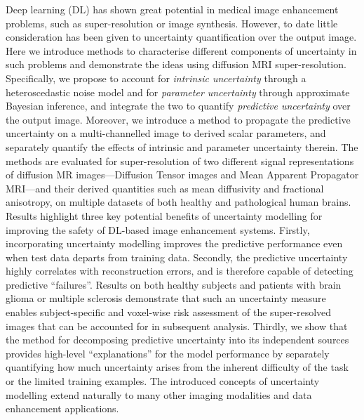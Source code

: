 	Deep learning (DL) has shown great potential in medical image enhancement problems, such as super-resolution or image synthesis. However, to date little consideration has been given to uncertainty quantification over the output image. Here we introduce methods to characterise different components of uncertainty in such problems and demonstrate the ideas using diffusion MRI super-resolution.  Specifically, we propose to account for \textit{intrinsic uncertainty} through a heteroscedastic noise model and for \textit{parameter uncertainty} through approximate Bayesian inference, and integrate the two to quantify \textit{predictive uncertainty} over the output image. Moreover, we introduce a method to propagate the predictive uncertainty on a multi-channelled image to derived scalar parameters, and separately quantify the effects of intrinsic and parameter uncertainty therein. The methods are evaluated for super-resolution of two different signal representations of diffusion MR images---Diffusion Tensor images and Mean Apparent Propagator MRI---and their derived quantities such as mean diffusivity and fractional anisotropy, on multiple datasets of both healthy and pathological human brains. Results highlight three key potential benefits of uncertainty modelling for improving the safety of DL-based image enhancement systems. Firstly, incorporating uncertainty modelling improves the predictive performance even when test data departs from training data. Secondly, the predictive uncertainty highly correlates with reconstruction errors, and is therefore capable of detecting predictive ``failures''. Results on both healthy subjects and patients with brain glioma or multiple sclerosis demonstrate that such an uncertainty measure enables subject-specific and voxel-wise risk assessment of the super-resolved images that can be accounted for in subsequent analysis. Thirdly, we show that the method for decomposing predictive uncertainty into its independent sources provides high-level ``explanations'' for the model performance by separately quantifying how much uncertainty arises from the inherent difficulty of the task or the limited training examples. The introduced concepts of uncertainty modelling extend naturally to many other imaging modalities and data enhancement applications.


